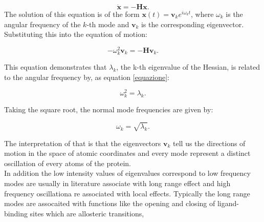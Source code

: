 \documentclass[English, Lau, oneside]{sapthesis}
\begin{document}
\begin{equation}
\ddot{\mathbf{x}} = -\mathbf{H} \mathbf{x}.
\end{equation}
The solution of this equation is of the form \( \mathbf{x}(t) = \mathbf{v}_k e^{i \omega_k t} \), where \( \omega_k \) is the angular frequency of the \( k \)-th mode and \( \mathbf{v}_k \) is the corresponding eigenvector. Substituting this into the equation of motion:

\begin{equation}
-\omega_k^2 \mathbf{v}_k = -\mathbf{H} \mathbf{v}_k.
\end{equation}

This equation demonstrates that \( \lambda_k \), the k-th eigenvalue of the Hessian, is related to the angular frequency by, as equation \ref{equazione}:

\begin{equation}
\omega_k^2 = \lambda_k.
\end{equation}

Taking the square root, the normal mode frequencies are given by:

\begin{equation}
\omega_k = \sqrt{\lambda_k}.
\end{equation}

The interpretation of that is that the eigenvectors \( \mathbf{v}_k \) tell us the directions of motion in the space of atomic coordinates and every mode represent a distinct oscillation of every atoms of the protein.\\
In addition the low intensity values of eigenvalues correspond to low frequency modes are usually in literature associate with long range effect and high frequency oscillationa re associated with local effects.
Typically the long range modes are assocaited with functions like the opening and closing of ligand-binding sites which are  allosteric transitions, 


\newpage
\end{document}
